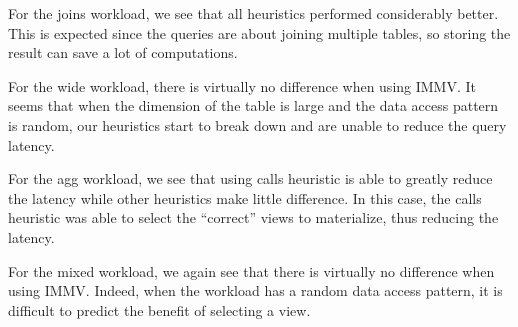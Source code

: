 For the joins workload, we see that all heuristics performed considerably better. This is expected since the queries are about joining multiple tables, so storing the result can save a lot of computations.


For the wide workload, there is virtually no difference when using IMMV. It seems that when the dimension of the table is large and the data access pattern is random, our heuristics start to break down and are unable to reduce the query latency.


For the agg workload, we see that using calls heuristic is able to greatly reduce the latency while other heuristics make little difference. In this case, the calls heuristic was able to select the “correct” views to materialize, thus reducing the latency.


For the mixed workload, we again see that there is virtually no difference when using IMMV. Indeed, when the workload has a random data access pattern, it is difficult to predict the benefit of selecting a view.
